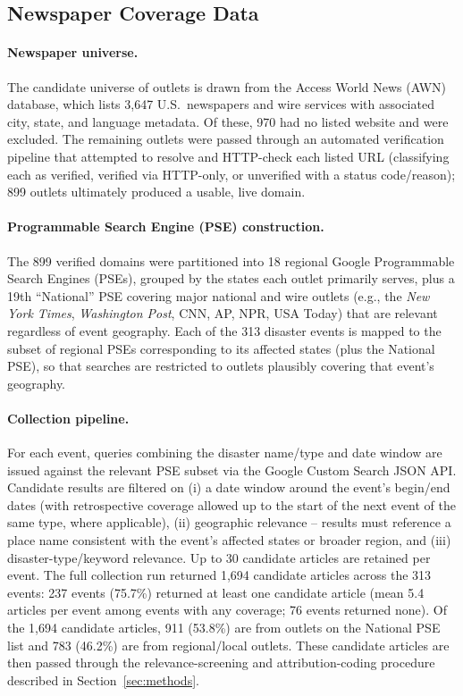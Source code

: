 \documentclass[12pt]{article}
\begin{document}
\subsection{Newspaper Coverage Data}

\paragraph{Newspaper universe.} The candidate universe of outlets is
drawn from the Access World News (AWN) database, which lists 3,647
U.S.\ newspapers and wire services with associated city, state, and
language metadata. Of these, 970 had no listed website and were
excluded. The remaining outlets were passed through an automated
verification pipeline that attempted to resolve and HTTP-check each
listed URL (classifying each as verified, verified via HTTP-only,
or unverified with a status code/reason); 899 outlets ultimately
produced a usable, live domain.

\paragraph{Programmable Search Engine (PSE) construction.} The 899
verified domains were partitioned into 18 regional Google
Programmable Search Engines (PSEs), grouped by the states each outlet
primarily serves, plus a 19th ``National'' PSE covering major national
and wire outlets (e.g., the \emph{New York Times}, \emph{Washington
Post}, CNN, AP, NPR, USA Today) that are relevant regardless of event
geography. Each of the 313 disaster events is mapped to the subset of
regional PSEs corresponding to its affected states (plus the National
PSE), so that searches are restricted to outlets plausibly covering
that event's geography.

\paragraph{Collection pipeline.} For each event, queries combining the
disaster name/type and date window are issued against the relevant
PSE subset via the Google Custom Search JSON API. Candidate results
are filtered on (i) a date window around the event's begin/end dates
(with retrospective coverage allowed up to the start of the next event
of the same type, where applicable), (ii) geographic relevance --
results must reference a place name consistent with the event's
affected states or broader region, and (iii) disaster-type/keyword
relevance. Up to 30 candidate articles are retained per event. The
full collection run returned 1,694 candidate articles across the 313
events: 237 events (75.7\%) returned at least one candidate article
(mean 5.4 articles per event among events with any coverage; 76
events returned none). Of the 1,694 candidate articles, 911 (53.8\%)
are from outlets on the National PSE list and 783 (46.2\%) are from
regional/local outlets. These candidate articles are then passed
through the relevance-screening and attribution-coding procedure
described in Section~\ref{sec:methods}.
\end{document}
